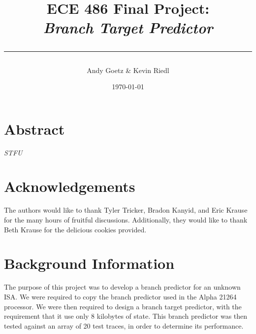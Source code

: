 \documentclass[twocolumn]{article}
\author{\LARGE Andy Goetz \& Kevin Riedl}
\date{\today}
\title{\Huge \textbf{ECE 486 Final Project:} \\ \it{Branch Target Predictor} \\ \rule{\linewidth}{0.5mm}}
\begin{document}
\maketitle
\section{Abstract}
\textit{
  STFU
}
\section{Acknowledgements}

The authors would like to thank Tyler Tricker, Bradon Kanyid, and Eric
Krause for the many hours of fruitful discussions. Additionally, they
would like to thank Beth Krause for the delicious cookies provided.

\section{Background Information}
The purpose of this project was to develop a branch predictor for an
unknown ISA. We were required to copy the branch predictor used in the
Alpha 21264 processor. We were then required to design a branch target
predictor, with the requirement that it use only 8 kilobytes of
state. This branch predictor was then tested against an array of 20
test traces, in order to determine its performance. 
\end{document}
